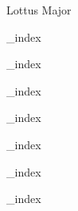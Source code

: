 \documentclass[a4paper,12pt]{article}
\begin{document}


\begin{center}

\huge{Lottus Major}

\end{center}



{_index}


{_index}


{_index}


{_index}


{_index}


{_index}


{_index}
\end{document}
